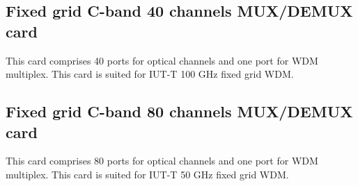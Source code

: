\documentclass[a4paper,11pt]{article}
\begin{document}
\subsection*{Fixed grid C-band 40 channels MUX/DEMUX card}

This card comprises 40 ports for optical channels and one port for WDM multiplex. This card is suited for IUT-T 100 GHz fixed grid WDM.

\subsection*{Fixed grid C-band 80 channels MUX/DEMUX card}

This card comprises 80 ports for optical channels and one port for WDM multiplex. This card is suited for IUT-T 50 GHz fixed grid WDM.
\end{document}

